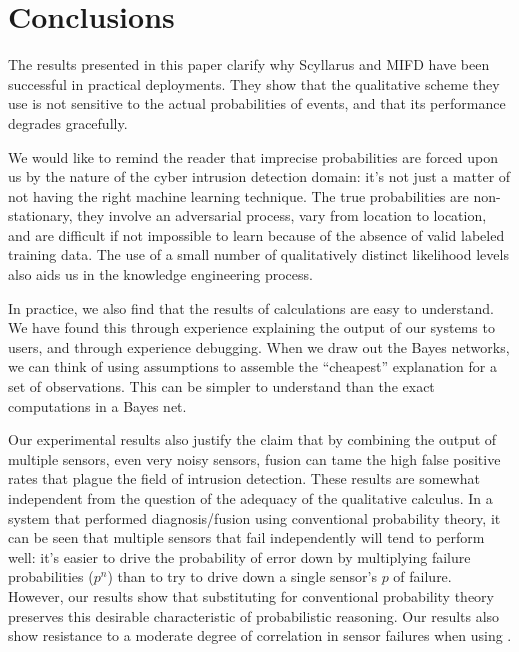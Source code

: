 
\section{Conclusions}
\label{sec:conclusions}

The results presented in this paper clarify why Scyllarus and
MIFD have been successful in practical deployments.
They show that the qualitative scheme they use is not sensitive to
the actual probabilities of events, and that its performance degrades
gracefully.

We would like to remind the reader that imprecise probabilities 
are forced upon us by the nature of the cyber intrusion detection domain: it's
not just a matter of not having the right machine learning technique.  The
true probabilities are non-stationary, they involve an adversarial process,
vary from location to location, and are difficult if not impossible to learn
because of the absence of valid labeled training data.
The use of a small number of qualitatively distinct likelihood levels also aids
us in the knowledge engineering process.

In practice, we also find that the results of \zplus calculations are easy to
understand.  We have found this through experience explaining the output of our
systems to users, and through experience debugging.  When we draw out the Bayes
networks, we can think of using assumptions to assemble the ``cheapest''
explanation for a set of observations.  This can be simpler to understand than
the exact computations in a Bayes net.

Our experimental results also justify the claim that by combining the output of
multiple sensors, even very noisy sensors, \ids fusion can tame the high false
positive rates that plague the field of intrusion detection.  These results are
somewhat independent from the question of the adequacy of the qualitative
calculus.  In a system that performed diagnosis/fusion using conventional
probability theory, it can be seen that multiple sensors that fail independently
will tend to perform well:  it's easier to drive the probability of error down
by multiplying failure probabilities ($p^n$) than to try to drive down a single
sensor's $p$ of failure.  However, our results show that substituting \zplus for
conventional probability theory preserves this desirable characteristic of
probabilistic reasoning. Our results also show resistance to a moderate degree
of correlation in sensor failures when using \zplus.


